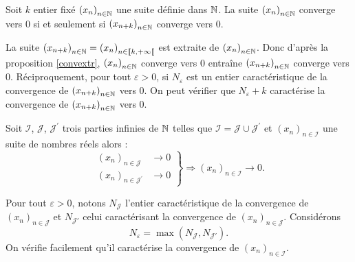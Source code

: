\begin{propn}
Soit $k$ entier fixé  $\left(x_n \right)_{n\in\mathbb{N}}$ une suite définie dans $\mathbb{N}$.  La suite $\left(x_n \right)_{n\in\mathbb{N}}$ converge vers $0$ si et seulement si $\left(x_{n+k} \right)_{n\in\mathbb{N}}$ converge vers $0$.
\end{propn}
\begin{demo}
  La suite $\left(x_{n+k} \right)_{n\in\mathbb{N}} = \left(x_{n} \right)_{n\in\llbracket k, +\infty \llbracket}$ est extraite de $\left(x_{n} \right)_{n\in\mathbb{N}}$. Donc d'après la proposition \ref{convextr}, $\left(x_{n} \right)_{n\in\mathbb{N}}$ converge vers $0$ entraîne $\left(x_{n+k} \right)_{n\in\mathbb{N}}$ converge vers $0$.\newline
Réciproquement, pour tout $\varepsilon>0$, si $N_\varepsilon$ est un entier caractéristique de la convergence de $\left(x_{n+k} \right)_{n\in\mathbb{N}}$ vers $0$. On peut vérifier que $N_\varepsilon + k$ caractérise la convergence de $\left(x_{n+k} \right)_{n\in\mathbb{N}}$ vers $0$. 
\end{demo}

\begin{propn} \label{convcompl}
 Soit $\mathcal I$, $\mathcal J$, $\mathcal J^\prime$ trois parties infinies de $\mathbb{N}$ telles que $\mathcal I = \mathcal J \cup \mathcal J^\prime$ et $(x_n)_{n\in \mathcal I}$ une suite de nombres réels alors :
\begin{displaymath}
 \left. 
\begin{aligned}
 (x_n)_{n\in \mathcal J} &\rightarrow 0 \\
 (x_n)_{n\in \mathcal J^\prime} &\rightarrow 0
\end{aligned}
\right\rbrace 
\Rightarrow (x_n)_{n\in \mathcal I} \rightarrow 0 .
\end{displaymath}
\end{propn}
\begin{demo}
  Pour tout $\varepsilon >0$, notons $N_{\mathcal{J}}$ l'entier caractéristique de la convergence de $\left(x_{n} \right)_{n\in\mathcal{J}}$ et $N_{\mathcal{J}'}$ celui caractérisant la convergence de $\left(x_{n} \right)_{n\in\mathcal{J}}$. Considérons
  \begin{displaymath}
    N_\varepsilon = \max(N_{\mathcal{J}},N_{\mathcal{J}'}).
  \end{displaymath}
On vérifie facilement qu'il caractérise la convergence de $\left(x_{n} \right)_{n\in\mathcal{I}}$.
\end{demo}

